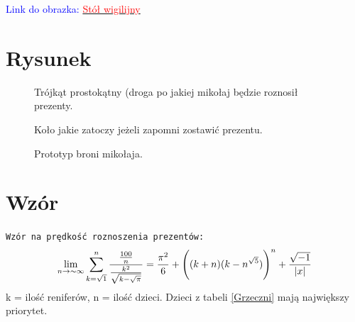 \documentclass[11pt]{book}
\begin{document}
\textcolor{blue}{\LARGE{Link do obrazka:}} \href{https://d-pt.ppstatic.pl/kadry/k/r/1/24/85/5c06a1f710501_o,size,969x565,crop,0.0000x0.0997x0.9956x0.7913,q,71,h,a346cb.jpg}{\Large \textcolor{red}{Stół wigilijny}}

\chapter{Rysunek}

\begin{figure}[h]
	\begin{center}
		\caption{Trójkąt prostokątny (droga po jakiej mikołaj będzie roznosił prezenty.}
	\end{center}
\end{figure}

\begin{figure}[h]
	\begin{center}
		\caption{Koło jakie zatoczy jeżeli zapomni zostawić prezentu.}
	\end{center}
\end{figure}

\begin{figure}[h]
	\begin{center}
		\caption{Prototyp broni mikołaja.}
	\end{center}
\end{figure}

\chapter{Wzór}
\Huge\texttt{Wzór na prędkość roznoszenia prezentów:}
\LARGE{
$$
\lim_{n \to \sim\infty}
\sum_{k=\sqrt{1}}^n \frac{\frac{100}{n}}{\frac{k^2}{\sqrt{k-\sqrt{\pi}}}}
= \frac{\pi^2}{6} + \Bigg( (k+n) (k-n^{\sqrt{5}}) \Bigg) ^{n} + \frac{\sqrt{-1}}{|x|}\\
$$
k = ilość reniferów,
n = ilość dzieci.
\tab
Dzieci z tabeli \ref{Grzeczni} mają największy priorytet.
}
\end{document}
